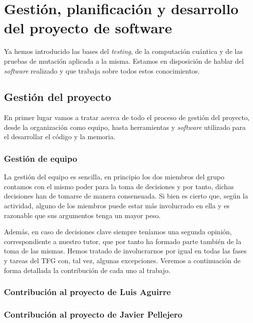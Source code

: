 \chapter[Gestión, planificación y desarrollo del software]{Gestión, planificación y desarrollo del proyecto de software}
Ya hemos introducido las bases del \textit{testing}, de la computación cuántica y de las pruebas de mutación aplicada a la misma. Estamos en disposición de hablar del \textit{software} realizado y que trabaja sobre todos estos conocimientos.

\section{Gestión del proyecto}

En primer lugar vamos a tratar acerca de todo el proceso de gestión del proyecto, desde la organización como equipo, hasta herramientas y \textit{software} utilizado para el desarrollar el código y la memoria.

\subsection{Gestión de equipo}

La gestión del equipo es sencilla, en principio los dos miembros del grupo contamos con el mismo poder para la toma de decisiones y por tanto, dichas decisiones han de tomarse de manera consensuada. Si bien es cierto que, según la actividad, alguno de los miembros puede estar más involucrado en ella y es razonable que sus argumentos tenga un mayor peso.

Además, en caso de decisiones clave siempre teníamos una segunda opinión, correspondiente a nuestro tutor, que por tanto ha formado parte también de la toma de las mismas. Hemos tratado de involucrarnos por igual en todas las fases y tareas del TFG con, tal vez, algunas excepciones. Veremos a continuación de forma detallada la contribución de cada uno al trabajo.

\subsection{Contribución al proyecto de Luis Aguirre}

\subsection{Contribución al proyecto de Javier Pellejero}

